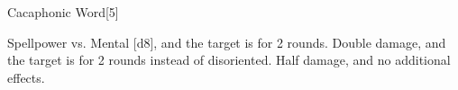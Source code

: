 \begin{spellsection}{Cacaphonic Word}[5]
    \begin{spellheader}
    \end{spellheader}
    \begin{spellcontent}
        \begin{spelltargetinginfo}
        \end{spelltargetinginfo}
        \begin{spelleffects}
            \begin{spellattack}{Spellpower vs. Mental}
                \spellsuccess {}[d8], and the target is \disoriented for 2 rounds.
                \spellcritical Double damage, and the target is \confused for 2 rounds instead of disoriented.
                \spellfailure Half damage, and no additional effects.
            \end{spellattack}
        \end{spelleffects}
    \end{spellcontent}
    \begin{spellfooter}
        \miscastexplode
    \end{spellfooter}
    \begin{spellaugments}
    \end{spellaugments}
\end{spellsection}

